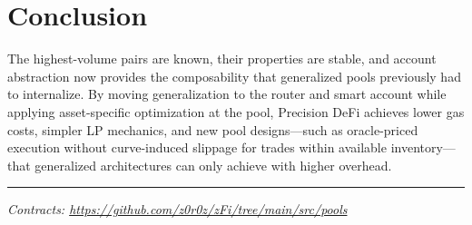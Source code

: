\documentclass[10pt,twocolumn]{article}
\begin{document}
\section{Conclusion}

The highest-volume pairs are known, their properties are stable, and account abstraction now provides the composability that generalized pools previously had to internalize. By moving generalization to the router and smart account while applying asset-specific optimization at the pool, Precision DeFi achieves lower gas costs, simpler LP mechanics, and new pool designs---such as oracle-priced execution without curve-induced slippage for trades within available inventory---that generalized architectures can only achieve with higher overhead.

\vspace{6pt}
\noindent\rule{\columnwidth}{0.4pt}
\vspace{2pt}

{\small\itshape Contracts: \url{https://github.com/z0r0z/zFi/tree/main/src/pools}}
\end{document}
